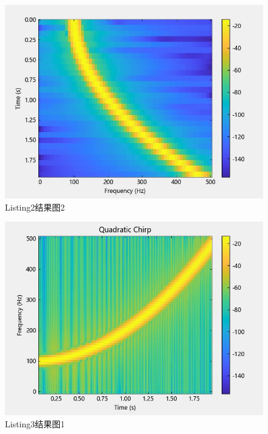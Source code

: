 \documentclass{article}
\begin{document}
	\begin{figure}[htbp]
		\centering
		\includegraphics{hw5(2)-2.jpeg}
		\caption{Listing2结果图2}
		\label{fig2-2}
	\end{figure}
	
	\begin{figure}[htbp]
		\centering
		\includegraphics{hw5(3)-1.jpeg}
		\caption{Listing3结果图1}
		\label{fig3-1}
	\end{figure}
\end{document}

